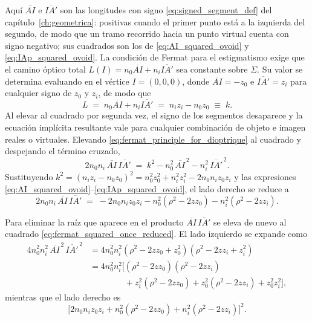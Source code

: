 Aquí $\overline{AI}$ e $\overline{IA'}$ son las longitudes con signo
\eqref{eq:signed_segment_def} del capítulo~\ref{ch:geometrica}: positivas
cuando el primer punto está a la izquierda del segundo, de modo que un tramo
recorrido hacia un punto virtual cuenta con signo negativo; sus cuadrados son
los de \eqref{eq:AI_squared_ovoid} y \eqref{eq:IAp_squared_ovoid}. La
condición de Fermat para el estigmatismo exige que el camino óptico total
$L(I)=n_0\overline{AI}+n_i\overline{IA'}$ sea constante sobre $\Sigma$. Su
valor se determina evaluando en el vértice $I=(0,0,0)$, donde
$\overline{AI}=-z_0$ e $\overline{IA'}=z_i$ para cualquier signo de $z_0$ y
$z_i$, de modo que
\begin{equation}
L\;=\;n_0\overline{AI}+n_i\overline{IA'}
\;=\;n_iz_i-n_0z_0
\;\equiv\;k.
\label{eq:fermat_principle_for_dioptrique}
\end{equation}
Al elevar al cuadrado por segunda vez, el signo de los segmentos desaparece y
la ecuación implícita resultante vale para cualquier combinación de objeto e
imagen reales o virtuales. Elevando \eqref{eq:fermat_principle_for_dioptrique}
al cuadrado y despejando el término cruzado,
\begin{equation}
2n_0n_i\,\overline{AI}\,\overline{IA'}
\;=\;
k^2-n_0^2\,\overline{AI}^{\,2}-n_i^2\,\overline{IA'}^{\,2}.
\label{eq:fermat_squared_once}
\end{equation}
Sustituyendo $k^2=(n_iz_i-n_0z_0)^2=n_0^2z_0^2+n_i^2z_i^2-2n_0n_iz_0z_i$ y
las expresiones \eqref{eq:AI_squared_ovoid}--\eqref{eq:IAp_squared_ovoid}, el
lado derecho se reduce a
\begin{equation}
2n_0n_i\,\overline{AI}\,\overline{IA'}
\;=\;
-2n_0n_iz_0z_i
-n_0^2(\rho^2-2zz_0)
-n_i^2(\rho^2-2zz_i).
\label{eq:fermat_squared_once_reduced}
\end{equation}

Para eliminar la raíz que aparece en el producto $\overline{AI}\,\overline{IA'}$
se eleva de nuevo al cuadrado \eqref{eq:fermat_squared_once_reduced}. El lado
izquierdo se expande como
\begin{equation}
\begin{aligned}
4n_0^2n_i^2\,\overline{AI}^{\,2}\,\overline{IA'}^{\,2}
&=
4n_0^2n_i^2(\rho^2-2zz_0+z_0^2)(\rho^2-2zz_i+z_i^2)
\\
&=
4n_0^2n_i^2\bigl[(\rho^2-2zz_0)(\rho^2-2zz_i)
\\
&\phantom{=4n_0^2n_i^2\bigl[}
+z_i^2(\rho^2-2zz_0)
+z_0^2(\rho^2-2zz_i)
+z_0^2z_i^2\bigr],
\end{aligned}
\label{eq:LHS_fermat_squared_twice}
\end{equation}
mientras que el lado derecho es
\begin{equation}
\bigl[2n_0n_iz_0z_i+n_0^2(\rho^2-2zz_0)+n_i^2(\rho^2-2zz_i)\bigr]^2.
\label{eq:RHS_fermat_squared_twice}
\end{equation}

